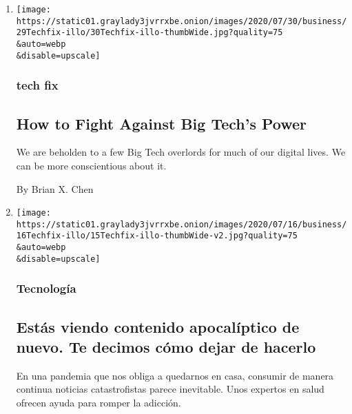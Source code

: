 \begin{enumerate}
\def\labelenumi{\arabic{enumi}.}
\item
  \href{/2020/07/29/technology/personaltech/big-tech-power-how-to-fight.html}{}

  \texttt{[image: https://static01.graylady3jvrrxbe.onion/images/2020/07/30/business/29Techfix-illo/30Techfix-illo-thumbWide.jpg?quality=75\\\&auto=webp\\\&disable=upscale]}

  \hypertarget{tech-fix}{%
  \subsubsection{tech fix}\label{tech-fix}}

  \hypertarget{how-to-fight-against-big-techs-power}{%
  \subsection{How to Fight Against Big Tech's
  Power}\label{how-to-fight-against-big-techs-power}}

  We are beholden to a few Big Tech overlords for much of our digital
  lives. We can be more conscientious about it.

  By Brian X. Chen
\item
  \href{/es/2020/07/22/espanol/negocios/doomscrolling-que-es.html}{}

  \texttt{[image: https://static01.graylady3jvrrxbe.onion/images/2020/07/16/business/16Techfix-illo/15Techfix-illo-thumbWide-v2.jpg?quality=75\\\&auto=webp\\\&disable=upscale]}

  \hypertarget{tecnologuxeda}{%
  \subsubsection{Tecnología}\label{tecnologuxeda}}

  \hypertarget{estuxe1s-viendo-contenido-apocaluxedptico-de-nuevo-te-decimos-cuxf3mo-dejar-de-hacerlo}{%
  \subsection{Estás viendo contenido apocalíptico de nuevo. Te decimos
  cómo dejar de
  hacerlo}\label{estuxe1s-viendo-contenido-apocaluxedptico-de-nuevo-te-decimos-cuxf3mo-dejar-de-hacerlo}}

  En una pandemia que nos obliga a quedarnos en casa, consumir de manera
  continua noticias catastrofistas parece inevitable. Unos expertos en
  salud ofrecen ayuda para romper la adicción.


\end{enumerate}
